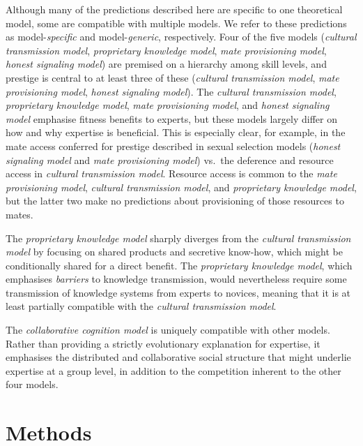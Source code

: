 \documentclass[
  11pt,
]{article}
\begin{document}
Although many of the predictions described here are specific to one theoretical model, some are compatible with multiple models. We refer to these predictions as model-\emph{specific} and model-\emph{generic}, respectively. Four of the five models (\emph{cultural transmission model}, \emph{proprietary knowledge model}, \emph{mate provisioning model}, \emph{honest signaling model}) are premised on a hierarchy among skill levels, and prestige is central to at least three of these (\emph{cultural transmission model}, \emph{mate provisioning model}, \emph{honest signaling model}). The \emph{cultural transmission model}, \emph{proprietary knowledge model}, \emph{mate provisioning model}, and \emph{honest signaling model} emphasise fitness benefits to experts, but these models largely differ on how and why expertise is beneficial. This is especially clear, for example, in the mate access conferred for prestige described in sexual selection models (\emph{honest signaling model} and \emph{mate provisioning model}) vs.~the deference and resource access in \emph{cultural transmission model}. Resource access is common to the \emph{mate provisioning model}, \emph{cultural transmission model}, and \emph{proprietary knowledge model}, but the latter two make no predictions about provisioning of those resources to mates.

The \emph{proprietary knowledge model} sharply diverges from the \emph{cultural transmission model} by focusing on shared products and secretive know-how, which might be conditionally shared for a direct benefit. The \emph{proprietary knowledge model}, which emphasises \emph{barriers} to knowledge transmission, would nevertheless require some transmission of knowledge systems from experts to novices, meaning that it is at least partially compatible with the \emph{cultural transmission model}.

The \emph{collaborative cognition model} is uniquely compatible with other models. Rather than providing a strictly evolutionary explanation for expertise, it emphasises the distributed and collaborative social structure that might underlie expertise at a group level, in addition to the competition inherent to the other four models.

\hypertarget{methods}{%
\section{Methods}\label{methods}}
\end{document}
